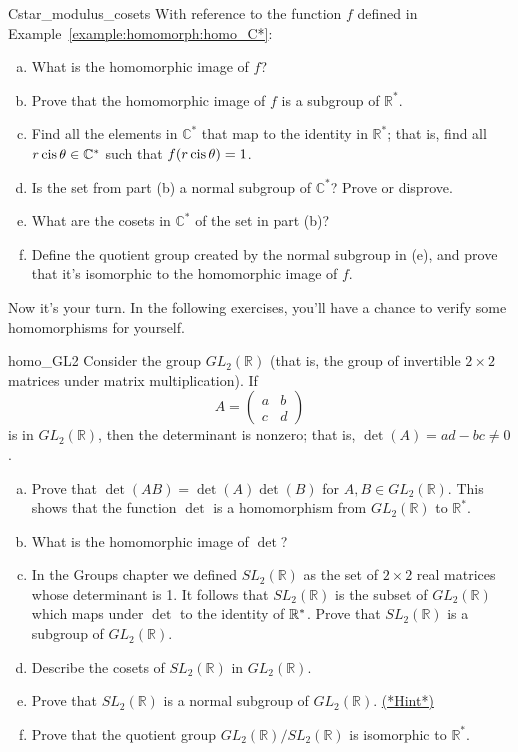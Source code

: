 \begin{exercise}{Cstar_modulus_cosets}
With reference to the function $f$ defined in Example~\ref{example:homomorph:homo_C*}:
\begin{enumerate}[(a)]
\item
What is the homomorphic image of $f$?
\item
Prove that the homomorphic image of $f$ is a subgroup of ${\mathbb R}^\ast$.
\item
Find all the elements in ${\mathbb C}^\ast$ that map  to the identity in ${\mathbb R}^\ast$; that is, find all $r \operatorname{cis} \theta \in {\mathbb C}^\ast$ such that $f(r \operatorname{cis} \theta) = 1$.
\item
Is the set from part (b) a normal subgroup of ${\mathbb C}^\ast$?  Prove or disprove.
\item
What are the cosets in ${\mathbb C}^\ast$ of the set in part (b)?
\item
Define the quotient group created by the normal subgroup in (e), and prove that it's isomorphic to  the homomorphic image of $f$.
\end{enumerate}
\end{exercise}
 

Now it's your turn. In the following exercises, you'll have a chance  to verify some homomorphisms for yourself.

\begin{exercise}{homo_GL2}
Consider the group $GL_2( {\mathbb R })$ (that is, the group of invertible $2 \times 2$ matrices under matrix multiplication). If
\[
A=
\begin{pmatrix}
a & b \\
c & d
\end{pmatrix}
\]
is in $GL_2( {\mathbb R })$, then the determinant is  nonzero; that is, $\det(A) = ad -bc
\neq 0$.  

\begin{enumerate}[(a)]
\item
Prove that $\det( AB) = \det(A) \det(B)$ for $A, B \in GL_2( {\mathbb R}
)$. This shows that the function $\det$ is a homomorphism from $ GL_2( {\mathbb R })$ to ${\mathbb R}^\ast$.

\item
What is the homomorphic image of $\det$?
\item
In the Groups chapter we defined $SL_2( {\mathbb R })$ as the set of $2 \times 2$ real matrices whose determinant is 1. It follows that $SL_2( {\mathbb R })$ is the subset of $GL_2( {\mathbb R })$ which maps under $\det$ to the identity of $\mathbb{R}^*$. Prove that $SL_2( {\mathbb R })$ is a subgroup of $GL_2( {\mathbb R })$.
\item
Describe the cosets of $SL_2( {\mathbb R })$ in $GL_2( {\mathbb R })$.
\item
Prove that $SL_2( {\mathbb R })$ is a normal subgroup of $GL_2( {\mathbb R })$. 
\hyperref[sec:homomorph:hints]{(*Hint*)} 
\item
Prove that the quotient group $GL_2( {\mathbb R }) / SL_2( {\mathbb R })$ is isomorphic to ${\mathbb R}^\ast$.
\end{enumerate}  
\end{exercise}

